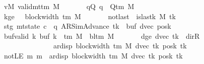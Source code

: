 \begin{isabellebody}
\ \ \ \ \ \ \ vM{\isacharcolon}{\kern0pt}\ {\isachardoublequoteopen}valid{\isacharunderscore}{\kern0pt}mttm\ M{\isachardoublequoteclose}\isanewline
\ \ \ \ \ \ \ qQ{\isacharcolon}{\kern0pt}\ {\isachardoublequoteopen}q\ {\isasymin}\ Q{\isacharunderscore}{\kern0pt}tm\ M{\isachardoublequoteclose}\isanewline
\ \ \ \ \ \ \ kge{}{\isacharcolon}{\kern0pt}\ {\isachardoublequoteopen}{}\ {\isasymle}\ block{\isacharunderscore}{\kern0pt}width\ {\isacharparenleft}{\kern0pt}{\isasymGamma}{\isacharunderscore}{\kern0pt}tm\ M{\isacharparenright}{\kern0pt}{\isachardoublequoteclose}\isanewline
\ \ \ \ \ \ \ notlast{\isacharcolon}{\kern0pt}\ {\isachardoublequoteopen}{\isasymnot}\ is{\isacharunderscore}{\kern0pt}last{\isacharunderscore}{\kern0pt}k\ M\ tk{\isachardoublequoteclose}\isanewline
\ \ \ \ \ \ \ stg{\isacharcolon}{\kern0pt}\ {\isachardoublequoteopen}mt{\isacharunderscore}{\kern0pt}state\ c{}\ {\isacharequal}{\kern0pt}\ {\isacharparenleft}{\kern0pt}q{\isacharcomma}{\kern0pt}\ AR{\isacharunderscore}{\kern0pt}SimAdvance{\isacharcomma}{\kern0pt}\ tk{\isacharcomma}{\kern0pt}\ {}{\isacharcomma}{\kern0pt}\ buf{\isacharcomma}{\kern0pt}\ dvec{\isacharcomma}{\kern0pt}\ posk{\isacharparenright}{\kern0pt}{\isachardoublequoteclose}\isanewline
\ \ \ \ \ \ \ buf{\isacharunderscore}{\kern0pt}valid{\isacharcolon}{\kern0pt}\ {\isachardoublequoteopen}{\isasymforall}k{\isachardot}{\kern0pt}\ buf\ k\ {\isasymin}\ {\isasymGamma}{\isacharunderscore}{\kern0pt}tm\ M\ {\isasymunion}\ {\isacharbraceleft}{\kern0pt}bl{\isacharunderscore}{\kern0pt}tm\ M{\isacharbraceright}{\kern0pt}{\isachardoublequoteclose}\isanewline
\ \ \ \ \ \ \ dge{}{\isacharcolon}{\kern0pt}\ {\isachardoublequoteopen}dvec\ tk\ {\isasymnoteq}\ dir{\isachardot}{\kern0pt}R\isanewline
\ \ \ \ \ \ \ \ \ \ \ \ \ \ \ \ \ \ {\isasymLongrightarrow}\ {}\ {\isacharless}{\kern0pt}\ ar{\isacharunderscore}{\kern0pt}disp\ {\isacharparenleft}{\kern0pt}block{\isacharunderscore}{\kern0pt}width\ {\isacharparenleft}{\kern0pt}{\isasymGamma}{\isacharunderscore}{\kern0pt}tm\ M{\isacharparenright}{\kern0pt}{\isacharparenright}{\kern0pt}\ {\isacharparenleft}{\kern0pt}dvec\ tk{\isacharparenright}{\kern0pt}\ {\isacharparenleft}{\kern0pt}posk\ tk{\isacharparenright}{\kern0pt}{\isachardoublequoteclose}\isanewline
\ \ \ \ \ \ \ notLE{\isacharcolon}{\kern0pt}\ {\isachardoublequoteopen}{\isasymAnd}m{\isachardot}{\kern0pt}\ m\ {\isacharless}{\kern0pt}\ ar{\isacharunderscore}{\kern0pt}disp\ {\isacharparenleft}{\kern0pt}block{\isacharunderscore}{\kern0pt}width\ {\isacharparenleft}{\kern0pt}{\isasymGamma}{\isacharunderscore}{\kern0pt}tm\ M{\isacharparenright}{\kern0pt}{\isacharparenright}{\kern0pt}\ {\isacharparenleft}{\kern0pt}dvec\ tk{\isacharparenright}{\kern0pt}\ {\isacharparenleft}{\kern0pt}posk\ tk{\isacharparenright}{\kern0pt}\isanewline

\end{isabellebody}
